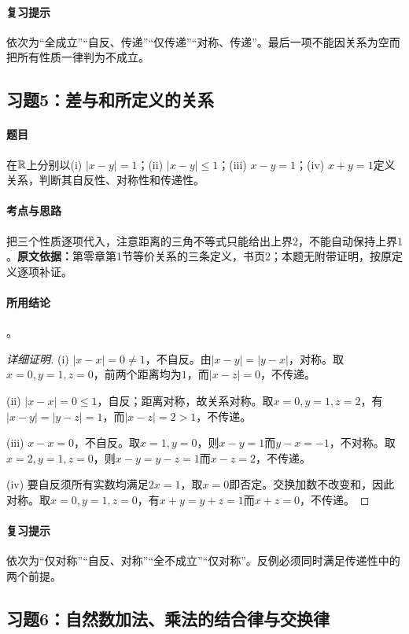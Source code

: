\paragraph{复习提示}依次为“全成立”“自反、传递”“仅传递”“对称、传递”。最后一项不能因关系为空而把所有性质一律判为不成立。

\subsection{习题5：差与和所定义的关系}\label{exercise:0:5}
\paragraph{题目}在$\mathbb R$上分别以(i) $|x-y|=1$；(ii) $|x-y|\leq1$；(iii) $x-y=1$；(iv) $x+y=1$定义关系，判断其自反性、对称性和传递性。
\paragraph{考点与思路}把三个性质逐项代入，注意距离的三角不等式只能给出上界$2$，不能自动保持上界$1$。\textbf{原文依据：}第零章第1节等价关系的三条定义，书页2；本题无附带证明，按原定义逐项补证。
\paragraph{所用结论}。
\begin{proof}[详细证明]
(i) $|x-x|=0\ne1$，不自反。由$|x-y|=|y-x|$，对称。取$x=0,y=1,z=0$，前两个距离均为$1$，而$|x-z|=0$，不传递。

(ii) $|x-x|=0\leq1$，自反；距离对称，故关系对称。取$x=0,y=1,z=2$，有$|x-y|=|y-z|=1$，而$|x-z|=2>1$，不传递。

(iii) $x-x=0$，不自反。取$x=1,y=0$，则$x-y=1$而$y-x=-1$，不对称。取$x=2,y=1,z=0$，则$x-y=y-z=1$而$x-z=2$，不传递。

(iv) 要自反须所有实数均满足$2x=1$，取$x=0$即否定。交换加数不改变和，因此对称。取$x=0,y=1,z=0$，有$x+y=y+z=1$而$x+z=0$，不传递。
\end{proof}
\paragraph{复习提示}依次为“仅对称”“自反、对称”“全不成立”“仅对称”。反例必须同时满足传递性中的两个前提。

\subsection{习题6：自然数加法、乘法的结合律与交换律}\label{exercise:0:6}
